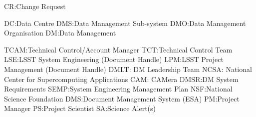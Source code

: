 CR:Change Request

DC:Data Centre
DMS:Data Management Sub-system
DMO:Data Management Organisation
DM:Data Management

TCAM:Technical Control/Account Manager
TCT:Technical Control Team
LSE:LSST System Engineering (Document Handle)
LPM:LSST Project Management (Document Handle)
DMLT: DM Leadership Team
NCSA: National Center for Supercomputing Applications
CAM: CAMera
DMSR:DM System Requirements
SEMP:System Engineering Management Plan
NSF:National Science Foundation
DMS:Document Management System (ESA)
PM:Project Manager
PS:Project Scientist
SA:Science Alert(s)

